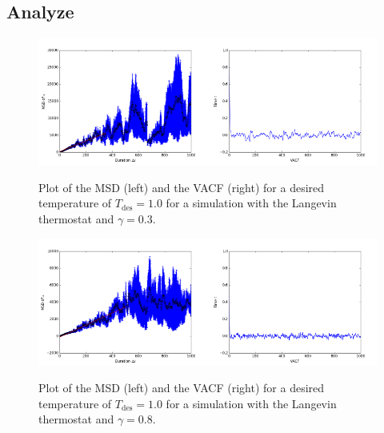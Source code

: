 \subsection{Analyze}

\begin{figure}[ht]
	\centering
	\includegraphics[width=0.5\textwidth]{../dat/langevin_T1d0_gamma0d3_MSD.png}\includegraphics[width=0.5\textwidth]{../dat/langevin_T1d0_gamma0d3_VACF.png}
	\caption{
		Plot of the MSD (left) and the VACF (right) for a desired temperature of $T_\text{des}=1.0$ for a simulation with the Langevin thermostat and $\gamma =0.3$.
	}
	\label{langevin3}
\end{figure}


\begin{figure}[ht]
	\centering
	\includegraphics[width=0.5\textwidth]{../dat/langevin_T1d0_gamma0d8_MSD.png}\includegraphics[width=0.5\textwidth]{../dat/langevin_T1d0_gamma0d8_VACF.png}
	\caption{
		Plot of the MSD (left) and the VACF (right) for a desired temperature of $T_\text{des}=1.0$ for a simulation with the Langevin thermostat and $\gamma =0.8$.
	}
	\label{langevin8}
\end{figure}


